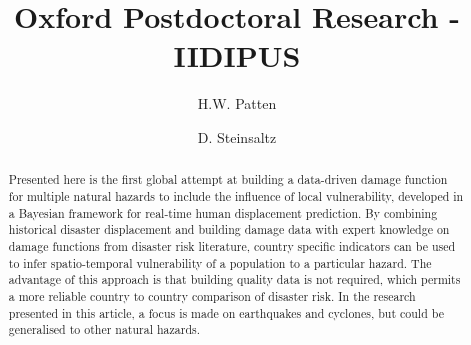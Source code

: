 \documentclass[10pt,a4paper]{article}
\title{Oxford Postdoctoral Research - IIDIPUS}
\date{}				%
\author[1]{H.W. Patten}
\author[1]{D. Steinsaltz}
\affil[1]{Department of Statistics, Oxford University, UK}
\begin{document}
  \cfoot{\vspace*{1.5\baselineskip}\thepage}
\begin{multicols}{1}
    \maketitle
    \begin{abstract}
Presented here is the first global attempt at building a data-driven damage function for multiple natural hazards to include the influence of local vulnerability, developed in a Bayesian framework for real-time human displacement prediction. By combining historical disaster displacement and building damage data with expert knowledge on damage functions from disaster risk literature, country specific indicators can be used to infer spatio-temporal vulnerability of a population to a particular hazard. The advantage of this approach is that building quality data is not required, which permits a more reliable country to country comparison of disaster risk. In the research presented in this article, a focus is made on earthquakes and cyclones, but could be generalised to other natural hazards.
\vspace{10pt}
    \end{abstract}
\end{multicols}
\end{document}
